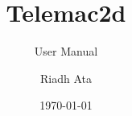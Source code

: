 \documentclass[Telemac2D]{../../data/TelemacDoc} %
\begin{document}
\let\cleardoublepage\clearpage

\title{Telemac2d}
\subtitle{User Manual}
\author{Riadh Ata}
\date{\today}
\maketitle
\clearpage



\newpage

\thispagestyle{empty}

\TelemacCopyright{}




\pagestyle{empty} %

\tableofcontents%


\pagestyle{fancy} %
\end{document}
